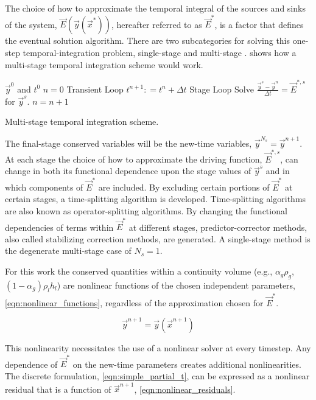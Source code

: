 The choice of how to approximate the temporal integral of the sources and sinks of the system, $\vec{E}(\vec{y}(\vec{x}^{*}))$, hereafter referred to as $\vec{E}^{*}$, is a factor that defines the eventual solution algorithm.
There are two subcategories for solving this one-step temporal-integration problem, single-stage and multi-stage \cite{Stewart1981,LeVeque2007}.
 shows how a multi-stage temporal integration scheme would work.

\begin{algo}[ht!]
\setlength{\baselineskip}{0.625\baselineskip}
\begin{algorithmic}[1]
\Require $\vec{y}^{0}$ and $t^{0}$
\Set $n = 0$
\Loop \; Transient Loop
    \State $t^{n+1} : = t^{n} + \Delta t$
     \; Stage Loop
		\BlackBox Solve $\displaystyle \frac{\vec{y}^{s} - \vec{y}^{n}}{\Delta t} =  \vec{E}^{*,s}$ for $\vec{y}^{s}$.
	\EndFor
	\State $n = n + 1$
\EndLoop
\end{algorithmic}
\caption{Multi-stage temporal integration scheme.}
\label{alg:single_stage_temporal}
\end{algo}

The final-stage conserved variables will be the new-time variables, $\vec{y}^{N_{s}} = \vec{y}^{n+1}$. 
At each stage the choice of how to approximate the driving function, $\vec{E}^{*,s}$, can change in both its functional dependence upon the stage values of $\vec{y}^{s}$ and in which components of $\vec{E}^{*}$ are included.
By excluding certain portions of $\vec{E}^{*}$ at certain stages, a time-splitting algorithm is developed.
Time-splitting algorithms are also known as operator-splitting algorithms. 
By changing the functional dependencies of terms within $\vec{E}^{*}$ at different stages, predictor-corrector methods, also called stabilizing correction methods, are generated. 
A single-stage method is the degenerate multi-stage case of $N_{s} = 1$.

For this work the conserved quantities within a continuity volume (e.g., $\alpha_g \rho_g$, $\left(1-\alpha_g\right)\rho_l h_l$) are nonlinear functions of the chosen independent parameters, \eqref{eqn:nonlinear_functions}, regardless of the approximation chosen for $\vec{E}^{*}$.

\begin{equation}
\label{eqn:nonlinear_functions}
\vec{y}^{n+1} = \vec{y}(\vec{x}^{n+1})
\end{equation}

This nonlinearity necessitates the use of a nonlinear solver at every timestep.
Any dependence of $\vec{E}^{*}$ on the new-time parameters creates additional nonlinearities.
The discrete formulation, \eqref{eqn:simple_partial_t}, can be expressed as a nonlinear residual that is a function of $\vec{x}^{n+1}$, \eqref{eqn:nonlinear_residuals}.

